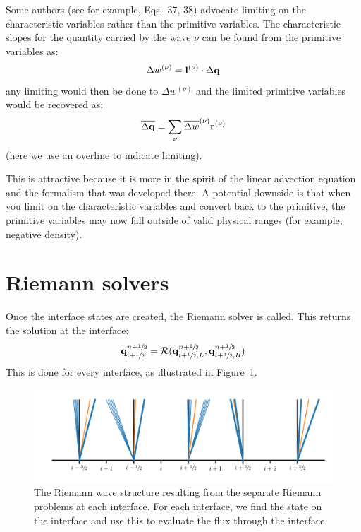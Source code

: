 Some authors (see for example, \cite{athena} Eqs.~37, 38) advocate
limiting on the characteristic variables rather than the primitive
variables.  The characteristic slopes for the quantity carried by the
wave $\nu$ can be found from the primitive variables
as: 
%
\begin{equation} 
\Delta w^{(\nu)} = {\bf l}^{(\nu)} \cdot \Delta {\bf q} 
\end{equation} 
%
any limiting would then be done to $\Delta w^{(\nu)}$ and the limited
primitive variables would be recovered as:
\begin{equation}
  \overline{\Delta {\bf q}} = \sum_\nu \overline{\Delta w}^{(\nu)}
  {\bf r}^{(\nu)} 
\end{equation} 
(here we use an overline to indicate limiting).

This is attractive because it is more in the spirit of the linear
advection equation and the formalism that was developed there.  A
potential downside is that when you limit on the characteristic
variables and convert back to the primitive, the primitive variables
may now fall outside of valid physical ranges (for example, negative
density).



\section{Riemann solvers}


Once the interface states are created, the Riemann solver is called.  This
returns the solution at the interface:
\begin{equation}
{\bf q}_{i+{\sfrac{1}{2}}}^{n+{\sfrac{1}{2}}} = \mathcal{R}({\bf q}_{i+{\sfrac{1}{2}},L}^{n+{\sfrac{1}{2}}}, {\bf q}_{i+{\sfrac{1}{2}},R}^{n+{\sfrac{1}{2}}})
\end{equation}
This is done for every interface, as illustrated in Figure~\ref{fig:euler:multiple_interfaces}.

\begin{figure}
\centering
\includegraphics[width=\linewidth]{multiple_interfaces}
\caption[Riemann wave structure at each interface]{\label{fig:euler:multiple_interfaces}
  The Riemann wave structure resulting from the separate Riemann problems at each interface.  For each
  interface, we find the state on the interface and use this to evaluate the flux through the interface.} 
\end{figure}

